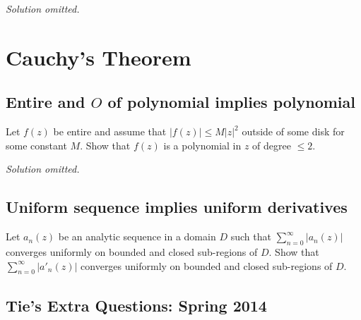 \emph{Solution omitted.}

\hypertarget{cauchys-theorem}{%
\section{Cauchy's Theorem}\label{cauchys-theorem}}

\hypertarget{entire-and-o-of-polynomial-implies-polynomial}{%
\subsection{\texorpdfstring{Entire and \(O\) of polynomial implies
polynomial}{Entire and O of polynomial implies polynomial}}\label{entire-and-o-of-polynomial-implies-polynomial}}

\begin{problem}[?]

Let \(f(z)\) be entire and assume that
\({\left\lvert {f(z)} \right\rvert} \leq M |z|^2\) outside of some disk
for some constant \(M\). Show that \(f(z)\) is a polynomial in \(z\) of
degree \(\leq 2\).

\end{problem}

\emph{Solution omitted.}

\hypertarget{uniform-sequence-implies-uniform-derivatives}{%
\subsection{Uniform sequence implies uniform
derivatives}\label{uniform-sequence-implies-uniform-derivatives}}

\begin{problem}[?]

Let \(a_n(z)\) be an analytic sequence in a domain \(D\) such that
\(\displaystyle \sum_{n=0}^\infty |a_n(z)|\) converges uniformly on
bounded and closed sub-regions of \(D\). Show that
\(\displaystyle \sum_{n=0}^\infty |a'_n(z)|\) converges uniformly on
bounded and closed sub-regions of \(D\).

\end{problem}

\hypertarget{ties-extra-questions-spring-2014}{%
\subsection{Tie's Extra Questions: Spring
2014}\label{ties-extra-questions-spring-2014}}

